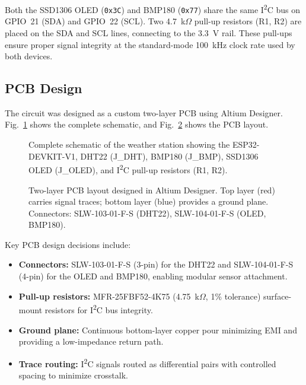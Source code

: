 \documentclass[conference]{IEEEtran}
\begin{document}
Both the SSD1306 OLED (\texttt{0x3C}) and BMP180 (\texttt{0x77}) share the same I\textsuperscript{2}C bus on GPIO~21 (SDA) and GPIO~22 (SCL). Two 4.7~k$\Omega$ pull-up resistors (R1, R2) are placed on the SDA and SCL lines, connecting to the 3.3~V rail. These pull-ups ensure proper signal integrity at the standard-mode 100~kHz clock rate used by both devices.

\subsection{PCB Design}

The circuit was designed as a custom two-layer PCB using Altium Designer. Fig.~\ref{fig:schematic} shows the complete schematic, and Fig.~\ref{fig:pcb_layout} shows the PCB layout.

\begin{figure}[h]
    \centering
    \caption{Complete schematic of the weather station showing the ESP32-DEVKIT-V1, DHT22 (J\_DHT), BMP180 (J\_BMP), SSD1306 OLED (J\_OLED), and I\textsuperscript{2}C pull-up resistors (R1, R2).}
    \label{fig:schematic}
\end{figure}

\begin{figure}[h]
    \centering
    \caption{Two-layer PCB layout designed in Altium Designer. Top layer (red) carries signal traces; bottom layer (blue) provides a ground plane. Connectors: SLW-103-01-F-S (DHT22), SLW-104-01-F-S (OLED, BMP180).}
    \label{fig:pcb_layout}
\end{figure}

Key PCB design decisions include:
\begin{itemize}
    \item \textbf{Connectors:} SLW-103-01-F-S (3-pin) for the DHT22 and SLW-104-01-F-S (4-pin) for the OLED and BMP180, enabling modular sensor attachment.
    \item \textbf{Pull-up resistors:} MFR-25FBF52-4K75 (4.75~k$\Omega$, 1\% tolerance) surface-mount resistors for I\textsuperscript{2}C bus integrity.
    \item \textbf{Ground plane:} Continuous bottom-layer copper pour minimizing EMI and providing a low-impedance return path.
    \item \textbf{Trace routing:} I\textsuperscript{2}C signals routed as differential pairs with controlled spacing to minimize crosstalk.
\end{itemize}
\end{document}
